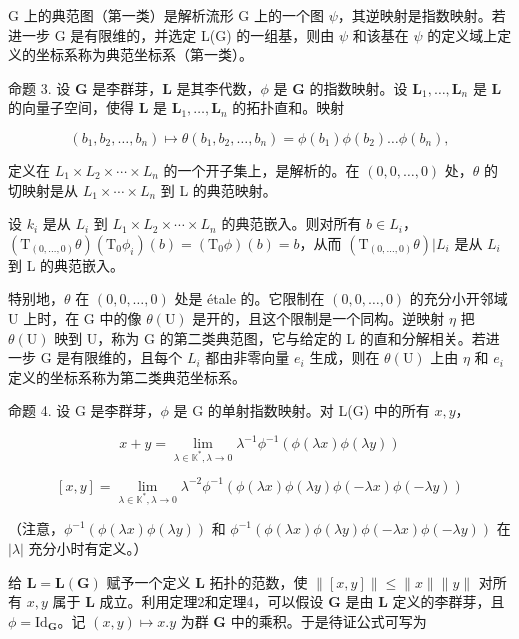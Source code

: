 G 上的典范图（第一类）是解析流形 G 上的一个图 \(\psi\)，其逆映射是指数映射。若进一步 G 是有限维的，并选定 L(G) 的一组基，则由 \(\psi\) 和该基在 \(\psi\) 的定义域上定义的坐标系称为典范坐标系（第一类）。

命题 3. 设 \(\mathbf{G}\) 是李群芽，\(\mathbf{L}\) 是其李代数，\(\phi\) 是 \(\mathbf{G}\) 的指数映射。设 \(\mathbf{L}_1, \ldots, \mathbf{L}_n\) 是 \(\mathbf{L}\) 的向量子空间，使得 \(\mathbf{L}\) 是 \(\mathbf{L}_1, \ldots, \mathbf{L}_n\) 的拓扑直和。映射

\[
(b _ {1}, b _ {2}, \dots , b _ {n}) \mapsto \theta (b _ {1}, b _ {2}, \dots , b _ {n}) = \phi (b _ {1}) \phi (b _ {2}) \dots \phi (b _ {n}),
\]

定义在 \(L_{1} \times L_{2} \times \cdots \times L_{n}\) 的一个开子集上，是解析的。在 \((0, 0, \ldots, 0)\) 处，\(\theta\) 的切映射是从 \(L_{1} \times \cdots \times L_{n}\) 到 L 的典范映射。

设 \(k_{i}\) 是从 \(L_{i}\) 到 \(L_{1} \times L_{2} \times \cdots \times L_{n}\) 的典范嵌入。则对所有 \(b \in L_{i}\)，\((\mathrm{T}_{(0,\ldots,0)}\theta)(\mathrm{T}_{0}\phi_{i})(b) = (\mathrm{T}_{0}\phi)(b) = b\)，从而 \((\mathrm{T}_{(0,\ldots,0)}\theta)|L_{i}\) 是从 \(L_{i}\) 到 L 的典范嵌入。

特别地，\(\theta\) 在 \((0, 0, \ldots, 0)\) 处是 étale 的。它限制在 \((0,0,\ldots,0)\) 的充分小开邻域 U 上时，在 G 中的像 \(\theta(\mathrm{U})\) 是开的，且这个限制是一个同构。逆映射 \(\eta\) 把 \(\theta(\mathrm{U})\) 映到 U，称为 G 的第二类典范图，它与给定的 L 的直和分解相关。若进一步 G 是有限维的，且每个 \(L_{i}\) 都由非零向量 \(e_{i}\) 生成，则在 \(\theta(\mathrm{U})\) 上由 \(\eta\) 和 \(e_{i}\) 定义的坐标系称为第二类典范坐标系。

命题 4. 设 G 是李群芽，\(\phi\) 是 G 的单射指数映射。对 L(G) 中的所有 \(x, y\)，


\[
x + y = \lim _ {\lambda \in \mathbb {K} ^ {*}, \lambda \rightarrow 0} \lambda^ {- 1} \phi^ {- 1} (\phi (\lambda x) \phi (\lambda y))\tag{1}
\]

\[
[ x, y ] = \lim _ {\lambda \in \mathbb {K} ^ {*}, \lambda \rightarrow 0} \lambda^ {- 2} \phi^ {- 1} (\phi (\lambda x) \phi (\lambda y) \phi (- \lambda x) \phi (- \lambda y))\tag{2}
\]

（注意，\(\phi^{-1}(\phi(\lambda x)\phi(\lambda y))\) 和 \(\phi^{-1}(\phi(\lambda x)\phi(\lambda y)\phi(-\lambda x)\phi(-\lambda y))\) 在 \(|\lambda|\) 充分小时有定义。）

给 \(\mathbf{L} = \mathbf{L}(\mathbf{G})\) 赋予一个定义 \(\mathbf{L}\) 拓扑的范数，使 \(\| [x,y] \| \leqslant \| x \| \| y \|\) 对所有 \(x, y\) 属于 \(\mathbf{L}\) 成立。利用定理2和定理4，可以假设 \(\mathbf{G}\) 是由 \(\mathbf{L}\) 定义的李群芽，且 \(\phi = \mathrm{Id}_{\mathbf{G}}\)。记 \((x,y) \mapsto x.y\) 为群 \(\mathbf{G}\) 中的乘积。于是待证公式可写为


